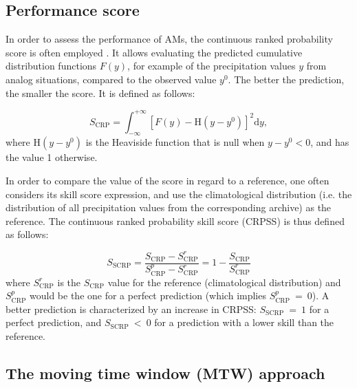 \documentclass[hess, manuscript]{copernicus}
\begin{document}
\subsection{Performance score}
\label{sec:performance}

In order to assess the performance of AMs, the continuous ranked probability score \citep[CRPS,][]{Brown1974, Matheson1976, Hersbach2000} is often employed \citep[see, e.g.,][]{Bontron2004, Bontron2005, BenDaoud2008, Horton2012, Marty2012, Radanovics2013, Chardon2014, Junk2015, BenDaoud2016, Caillouet2016}. It allows evaluating the predicted cumulative distribution functions $F(y)$, for example of the precipitation values $y$ from analog situations, compared to the observed value $y^{0}$. The better the prediction, the smaller the score. It is defined as follows:

\begin{equation}
\label{eq:CRPS}
S_{\text{CRP}} = \int_{-\infty}^{+\infty} \left[ F(y)-\text{H}(y-y^{0})\right]^{2} \text{d}y ,  
\end{equation}
where $\text{H}(y-y^{0})$ is the Heaviside function that is null when $y-y^{0}<0$, and has the value 1 otherwise.

In order to compare the value of the score in regard to a reference, one often considers its skill score expression, and use the climatological distribution (i.e. the distribution of all precipitation values from the corresponding archive) as the reference. The continuous ranked probability skill score (CRPSS) is thus defined as follows:

\begin{equation}
\label{eq:CRPSS}
S_{\text{SCRP}} = \frac{S_{\text{CRP}}-S_{\text{CRP}}^{r}}{S_{\text{CRP}}^{p}-S_{\text{CRP}}^{r}} = 1-\frac{S_{\text{CRP}}}{S_{\text{CRP}}^{r}}
\end{equation}
where $S_{\text{CRP}}^{r}$ is the $S_{\text{CRP}}$ value for the reference (climatological distribution) and $S_{\text{CRP}}^{p}$ would be the one for a perfect prediction (which implies $S_{\text{CRP}}^{p}~=~0$). A better prediction is characterized by an increase in CRPSS: $S_{\text{SCRP}}~=~1$ for a perfect prediction, and $S_{\text{SCRP}}~<~0$ for a prediction with a lower skill than the reference.


\subsection{The moving time window (MTW) approach}
\label{sec:mtw}
\end{document}
